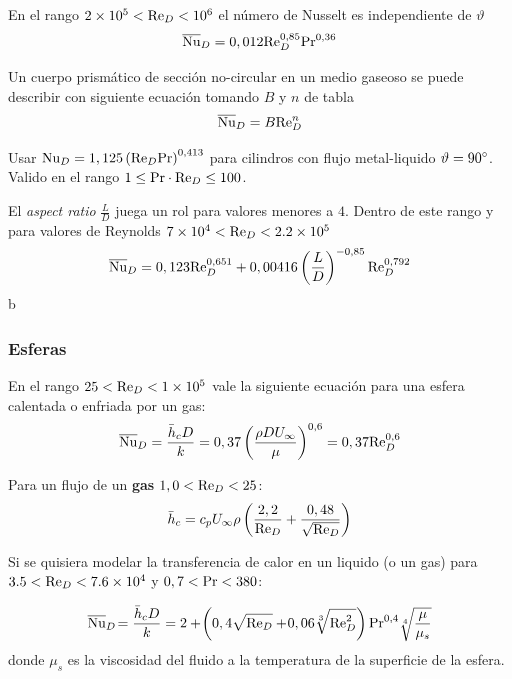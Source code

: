 En el rango $\num{2e5}<\textrm{Re}_D<\num{e6}$ el número de Nusselt es independiente de $\vartheta$
\begin{equation}
    \overline{\textrm{Nu}}_D=0,012\textrm{Re}_D^{0,85}\textrm{Pr}^{0,36}
\end{equation}

Un cuerpo prismático de sección no-circular en un medio gaseoso se puede describir con siguiente ecuación tomando $B$ y $n$ de tabla
\begin{equation}
    \overline{\textrm{Nu}}_D=B\textrm{Re}_D^n
\end{equation}

Usar $\textrm{Nu}_D=1,125\left( \textrm{Re}_D \textrm{Pr}\right)^{0,413}$ para cilindros con flujo metal-liquido $\vartheta=90^{\circ}$. Valido en el rango $1\leq\textrm{Pr}\cdot \textrm{Re}_D\leq 100$. 

El \emph{aspect ratio} $\frac{L}{D}$ juega un rol para valores menores a $4$. Dentro de este rango y para valores de Reynolds $\num{7e4} < \textrm{Re}_D < \num{2.2e5}$
\begin{equation}
    \overline{\textrm{Nu}}_D=0,123 \textrm{Re}_D^{0,651}+0,00416\left( \frac{L}{D} \right)^{-0,85} \textrm{Re}_D^{0,792}
\end{equation}b

\subsubsection{Esferas}
En el rango $25 < \textrm{Re}_D < \num{1e5}$ vale la siguiente ecuación para una esfera calentada o enfriada por un gas:
\begin{equation} \label{eq:nusseltspheregas}
    \overline{\textrm{Nu}}_D=\frac{\bar{h}_cD}{k}=0,37\left( \frac{\rho D U_\infty}{\mu}\right)^{0,6}=0,37\textrm{Re}_D^{0,6} 
\end{equation}

Para un flujo de un \textbf{gas} $1,0<\textrm{Re}_D<25$:
\begin{equation}
    \bar{h}_c = c_pU_\infty \rho \left(\frac{2,2}{\textrm{Re}_D}+\frac{0,48}{\sqrt{\textrm{Re}_D}} \right)
\end{equation}

Si se quisiera modelar la transferencia de calor en un liquido (o un gas) para $3.5<\textrm{Re}_D<\num{7.6e4}$ y $0,7<\textrm{Pr}<380$:

\begin{equation}
    \overline{\textrm{Nu}}_D\!=\frac{\bar{h}_c D}{k}=2+\!\left(0,4 \sqrt{\textrm{Re}_D}+\!0,06\sqrt[3]{\textrm{Re}_D^2}\right) \textrm{Pr}^{0,4}\sqrt[4]{\frac{\mu}{\mu_s}}
\end{equation}
donde $\mu_s$ es la viscosidad del fluido a la temperatura de la superficie de la esfera.

